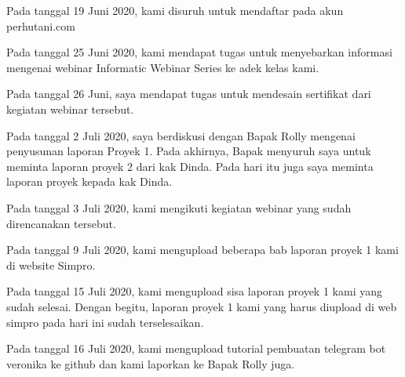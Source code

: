\documentclass[a4paper, 12 pt]{article}
\begin{document}
            \par Pada tanggal 19 Juni 2020, kami disuruh untuk mendaftar pada akun perhutani.com \\
            
            \par Pada tanggal 25 Juni 2020, kami mendapat tugas untuk menyebarkan informasi mengenai webinar Informatic Webinar Series ke adek kelas kami. \\
            
            \par Pada tanggal 26 Juni, saya mendapat tugas untuk mendesain sertifikat dari kegiatan webinar tersebut. \\
            
            \par Pada tanggal 2 Juli 2020, saya berdiskusi dengan Bapak Rolly mengenai penyusunan laporan Proyek 1. Pada akhirnya, Bapak menyuruh saya untuk meminta laporan proyek 2 dari kak Dinda. Pada hari itu juga saya meminta laporan proyek kepada kak Dinda. \\
            
            \par Pada tanggal 3 Juli 2020, kami mengikuti kegiatan webinar yang sudah direncanakan tersebut. \\
            
            \par Pada tanggal 9 Juli 2020, kami mengupload beberapa bab laporan proyek 1 kami di website Simpro. \\
            
            \par Pada tanggal 15 Juli 2020, kami mengupload sisa laporan proyek 1 kami yang sudah selesai. Dengan begitu, laporan proyek 1 kami yang harus diupload di web simpro pada hari ini sudah terselesaikan. \\
            
            \par Pada tanggal 16 Juli 2020, kami mengupload tutorial pembuatan telegram bot veronika ke github dan kami laporkan ke Bapak Rolly juga. \\
            
            
\end{document}
